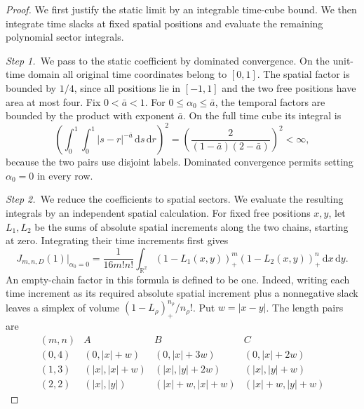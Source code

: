 \documentclass[12pt,oneside,openany]{book}
\numberwithin{equation}{section}
\theoremstyle{nogostyle}
\theoremstyle{definition}
\newcommand{\R}{\mathbb{R}}
\newcommand{\ud}{\,\mathrm{d}}
\begin{document}
\begin{proof}
  We first justify the static limit by an integrable time-cube bound. We then
  integrate time slacks at fixed spatial positions and evaluate the remaining
  polynomial sector integrals.


  \medskip
  \noindent\textit{Step 1.~}We pass to the static coefficient by dominated
  convergence.
  On the unit-time domain all original time coordinates belong to $[0,1]$. The
  spatial factor is bounded by $1/4$, since all positions lie in $[-1,1]$ and
  the two free positions have area at most four. Fix $0 < \bar{a} < 1$. For $0
  \le \alpha_0 \le \bar{a}$, the temporal factors are bounded by the product
  with exponent $\bar{a}$. On the full time cube its integral is
  \[
    \left(\int_0^1\int_0^1|s-r|^{-\bar{a}}\ud s\ud r\right)^2
    =\left(\frac{2}{(1-\bar{a})(2-\bar{a})}\right)^2<\infty,
  \]
  because the two pairs use disjoint labels. Dominated convergence permits
  setting $\alpha_0 = 0$ in every row.


  \medskip
  \noindent\textit{Step 2.~}We reduce the coefficients to spatial sectors.
  We evaluate the resulting integrals by an independent spatial calculation. For
  fixed free positions $x,y$, let $L_1,L_2$ be the sums of absolute spatial
  increments along the two chains, starting at zero. Integrating their time
  increments first gives
  \begin{equation}\label{E:static-sector}
    J_{m,n,D}(1)\big|_{\alpha_0=0}
    =\frac{1}{16m!n!}\int_{\R^2}
    (1-L_1(x,y))_+^m(1-L_2(x,y))_+^n\ud x\ud y.
  \end{equation}
  An empty-chain factor in this formula is defined to be one. Indeed, writing
  each time increment as its required absolute spatial increment plus a
  nonnegative slack leaves a simplex of volume $(1-L_\rho)_+^{n_\rho}/n_\rho!$.
  Put $w = |x-y|$. The length pairs are
  \[
    \begin{array}{c|ccc}
      (m,n)&A&B&C\\ \hline
      (0,4)&(0,|x|+w)&(0,|x|+3w)&(0,|x|+2w)\\
      (1,3)&(|x|,|x|+w)&(|x|,|y|+2w)&(|x|,|y|+w)\\
      (2,2)&(|x|,|y|)&(|x|+w,|x|+w)&(|x|+w,|y|+w)
    \end{array}
  \]


\end{proof}
\end{document}
